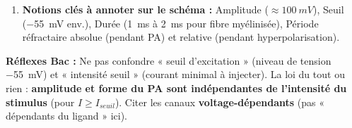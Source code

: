 \documentclass[11pt]{article}
\begin{document}
\begin{methode}
\begin{enumerate}
\begin{enumerate}
        \item \textbf{Retour au repos :} Fermeture des canaux  voltage-dépendants + activité de la pompe -ATPase (restauration gradients à long terme).
    \end{enumerate}
    \item \textbf{Notions clés à annoter sur le schéma :} Amplitude ($\approx \SI{100}{mV}$), Seuil (\SI{-55}{mV} env.), Durée (\SI{1}{ms} à \SI{2}{ms} pour fibre myélinisée), Période réfractaire absolue (pendant PA) et relative (pendant hyperpolarisation).
\end{enumerate}

\textbf{Réflexes Bac :} Ne pas confondre « seuil d'excitation » (niveau de tension \SI{-55}{mV}) et « intensité seuil » (courant minimal à injecter). La loi du tout ou rien : \textbf{amplitude et forme du PA sont indépendantes de l'intensité du stimulus} (pour $I \ge I_{seuil}$). Citer les canaux \textbf{voltage-dépendants} (pas « dépendants du ligand » ici).
\end{methode}
\end{document}

